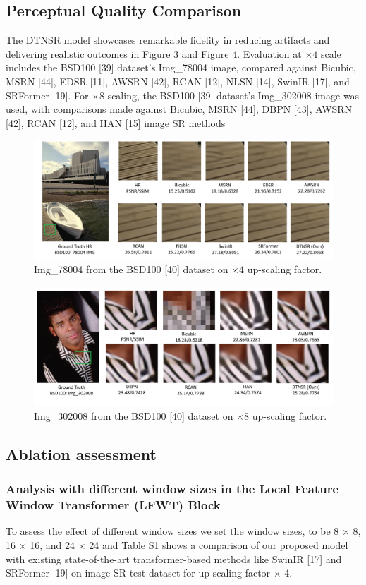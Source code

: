 \documentclass[journal]{IEEEtran}
\begin{document}
\subsection{Perceptual Quality Comparison}
The DTNSR model showcases remarkable fidelity in reducing artifacts and delivering realistic outcomes in Figure 3 and Figure 4. Evaluation at $\times 4$ scale includes the BSD100 [39] dataset's Img\_78004 image, compared against Bicubic, MSRN [44], EDSR [11], AWSRN [42], RCAN [12], NLSN [14], SwinIR [17], and SRFormer [19]. For $\times 8$ scaling, the BSD100 [39] dataset's Img\_302008 image was used, with comparisons made against Bicubic, MSRN [44], DBPN [43], AWSRN [42], RCAN [12], and HAN [15] image SR methods
\begin{multicols}{2}[\columnsep=10pt]
\begin{figure}
    \includegraphics[width=0.5\linewidth]{3Figure.pdf}
    \caption{Img\_78004 from the BSD100 [40] dataset on $\times4$ up-scaling factor.}
    \label{fig:13}
\end{figure}

\begin{figure}
    \includegraphics[width=0.5\linewidth]{4Figure.pdf}
    \caption{Img\_302008 from the BSD100 [40] dataset on $\times8$ up-scaling factor.}
    \label{fig:17}
\end{figure}
\end{multicols}

\subsection{Ablation assessment}
\subsubsection{Analysis with different window sizes in the Local Feature Window Transformer (LFWT) Block}
To assess the effect of different window sizes we set the window sizes, to be 8 $\times$ 8, 16 $\times$ 16, and 24 $\times$ 24 and Table S1 shows a comparison of our proposed model with existing state-of-the-art transformer-based methods like SwinIR [17] and SRFormer [19] on image SR test dataset for up-scaling factor $\times$ 4. 
\end{document}
